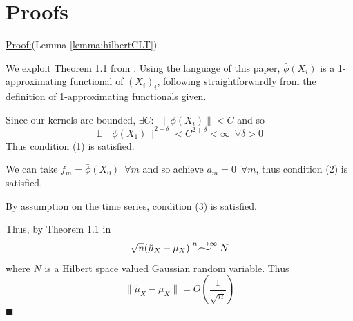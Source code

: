 \documentclass[]{article}
\newenvironment{claimproof}[1]{\par\noindent\underline{Proof:}\space#1}{\hfill $\blacksquare$}
\newcommand{\widesim}[2][1.5]{
  \mathrel{\overset{#2}{\scalebox{#1}[1]{$\sim$}}}}
\begin{document}
\section{Proofs}

\begin{claimproof}(Lemma \ref{lemma:hilbertCLT})

We exploit Theorem 1.1 from \cite{dehling2015bootstrap}. Using the language of this paper, $\bar{\phi}(X_i)$ is a 1-approximating functional of $(X_i)_i$, following straightforwardly from the definition of 1-approximating functionals given. 

Since our kernels are bounded, $\exists C: \enspace \|\bar{\phi}(X_i)\| < C $ and so \[\mathbb{E}\|\bar{\phi}(X_1)\|^{2+\delta} <C^{2+\delta}< \infty \enspace \forall \delta>0\]
Thus condition (1) is satisfied.

We can take $f_m = \bar{\phi}(X_0)\enspace \forall m$ and so achieve $a_m= 0 \enspace \forall m$, thus condition (2) is satisfied.

By assumption on the time series, condition (3) is satisfied.

Thus, by Theorem 1.1 in \cite{dehling2015bootstrap}
\[\sqrt{n} (\tilde{\mu}_{X} - \mu_{X}) \widesim[2]{n\longrightarrow\infty} N\]
where $N$ is a Hilbert space valued Gaussian random variable. Thus 
\[\|\tilde{\mu}_{X} - \mu_{X}\| = O(\frac{1}{\sqrt{n}})\]
\end{claimproof}
\end{document}
